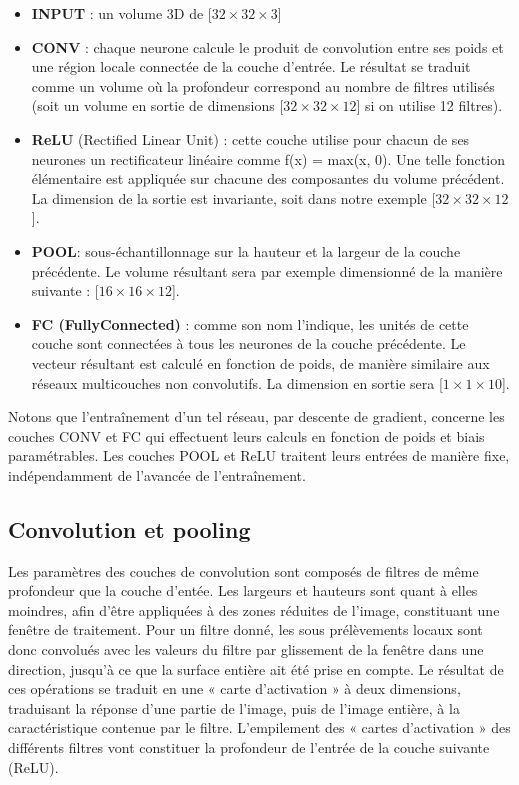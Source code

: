 \documentclass[a4paper,10pt]{report}
\begin{document}
\begin{itemize}
  \item \textbf{INPUT} : un volume 3D de [$32 \times 32 \times 3$]
  \item \textbf{CONV} : chaque neurone calcule le produit de convolution entre ses poids et une région locale connectée de la couche d’entrée. Le résultat se traduit comme un volume où la profondeur correspond au nombre de filtres utilisés (soit un volume en sortie de dimensions [$32 \times 32 \times 12$] si on utilise 12 filtres).
  \item \textbf{ReLU} (Rectified Linear Unit) : cette couche utilise pour chacun de ses neurones un rectificateur linéaire comme f(x) = max(x, 0). Une telle fonction élémentaire est appliquée sur chacune des composantes du volume précédent. La dimension de la sortie est invariante, soit dans notre exemple [$32 \times 32 \times 12$]. 
  \item \textbf{POOL}: sous-échantillonnage sur la hauteur et la largeur de la couche précédente. Le volume résultant sera par exemple dimensionné de la manière suivante : [$16 \times 16 \times 12$].
  \item \textbf{FC (FullyConnected)} : comme son nom l’indique, les unités de cette couche sont connectées à tous les neurones de la couche précédente. Le vecteur résultant est calculé en fonction de poids, de manière similaire aux réseaux multicouches non convolutifs. La dimension en sortie sera [$1 \times 1 \times 10$].
\end{itemize}
Notons que l’entraînement d’un tel réseau, par descente de gradient, concerne les couches CONV et FC qui effectuent leurs calculs en fonction de poids et biais paramétrables. Les couches POOL et ReLU traitent leurs entrées de manière fixe, indépendamment de l’avancée de l’entraînement.

\subsection{Convolution et pooling}
Les paramètres des couches de convolution sont composés de filtres de même profondeur que la couche d’entée. 
Les largeurs et hauteurs sont quant à elles moindres, afin d’être appliquées à des zones réduites de l’image, constituant une fenêtre de traitement. 
Pour un filtre donné, les sous prélèvements locaux sont donc convolués avec les valeurs du filtre par glissement de la fenêtre dans une direction, jusqu’à ce que la surface entière ait été prise en compte.
Le résultat de ces opérations se traduit en une « carte d’activation » à deux dimensions, traduisant la réponse d’une partie de l’image, puis de l’image entière, à la caractéristique contenue par le filtre. 
L’empilement des « cartes d’activation » des différents filtres vont constituer la profondeur de l’entrée de la couche suivante (ReLU). 
\end{document}
